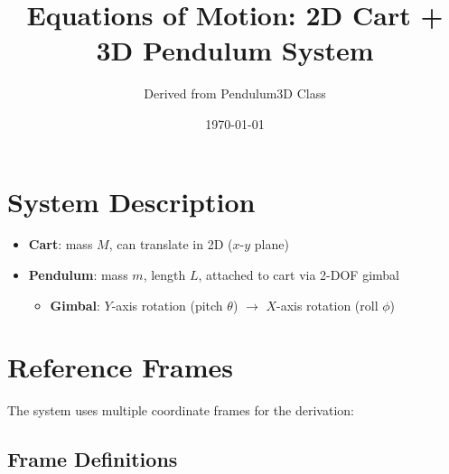 \documentclass[12pt]{article}
\title{Equations of Motion: 2D Cart + 3D Pendulum System}
\author{Derived from Pendulum3D Class}
\date{\today}
\begin{document}
\maketitle

\section{System Description}

\begin{itemize} 
    \item \textbf{Cart}: mass $M$, can translate in 2D ($x$-$y$ plane)
    \item \textbf{Pendulum}: mass $m$, length $L$, attached to cart via 2-DOF gimbal
    \begin{itemize}
        \item \textbf{Gimbal}: $Y$-axis rotation (pitch $\theta$) $\rightarrow$ $X$-axis rotation (roll $\phi$)
    \end{itemize}
\end{itemize}

\section{Reference Frames}

The system uses multiple coordinate frames for the derivation:

\subsection{Frame Definitions}
\end{document}
